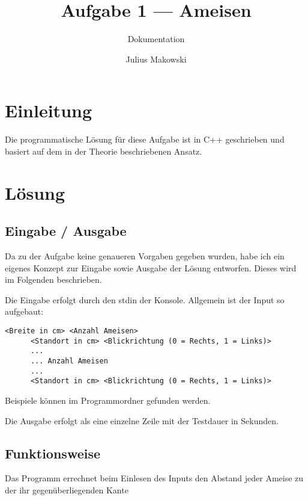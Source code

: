 \documentclass[12pt]{scrartcl}
\title{Aufgabe 1 --- Ameisen}
\subtitle{Dokumentation}
\author{Julius Makowski}
\date{}
\begin{document}
  \maketitle

  \section{Einleitung}
    Die programmatische L{\"o}sung f{\"u}r diese Aufgabe ist in C++ geschrieben und basiert auf dem in der Theorie beschriebenen Ansatz.

  \section{L{\"o}sung}
    \subsection{Eingabe / Ausgabe}
      Da zu der Aufgabe keine genaueren Vorgaben gegeben wurden, habe ich ein eigenes Konzept zur Eingabe sowie Ausgabe der L{\"o}sung entworfen. Dieses wird im Folgenden beschrieben.
      
      \vspace{12pt}\noindent
      Die Eingabe erfolgt durch den stdin der Konsole. Allgemein ist der Input so aufgebaut:

      \vspace{12pt}
      \begin{lstlisting}[style=input]
      <Breite in cm> <Anzahl Ameisen>
      <Standort in cm> <Blickrichtung (0 = Rechts, 1 = Links)>
      ...
      ... Anzahl Ameisen
      ...
      <Standort in cm> <Blickrichtung (0 = Rechts, 1 = Links)>
      \end{lstlisting}

      \vspace{12pt}\noindent
      Beispiele k{\"o}nnen im Programmordner gefunden werden.

      \vspace{12pt}\noindent
      Die Ausgabe erfolgt als eine einzelne Zeile mit der Testdauer in Sekunden.

    \pagebreak

    \subsection{Funktionsweise}
      Das Programm errechnet beim Einlesen des Inputs den Abstand jeder Ameise zu der ihr gegen{\"u}berliegenden Kante
      
\end{document}
